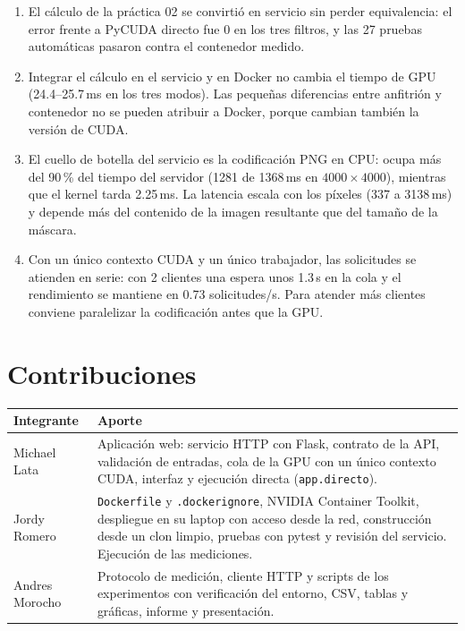 \documentclass[12pt]{article}
\begin{document}
\begin{enumerate}
\item El cálculo de la práctica 02 se convirtió en servicio sin perder equivalencia: el error frente a
      PyCUDA directo fue 0 en los tres filtros, y las 27 pruebas automáticas pasaron contra el
      contenedor medido.
\item Integrar el cálculo en el servicio y en Docker no cambia el tiempo de GPU (24.4--25.7\,ms en los
      tres modos). Las pequeñas diferencias entre anfitrión y contenedor no se pueden atribuir a
      Docker, porque cambian también la versión de CUDA.
\item El cuello de botella del servicio es la codificación PNG en CPU: ocupa más del 90\,\% del tiempo
      del servidor (1281 de 1368\,ms en $4000\times4000$), mientras que el kernel tarda 2.25\,ms. La
      latencia escala con los píxeles (337 a 3138\,ms) y depende más del contenido de la imagen
      resultante que del tamaño de la máscara.
\item Con un único contexto CUDA y un único trabajador, las solicitudes se atienden en serie: con 2
      clientes una espera unos 1.3\,s en la cola y el rendimiento se mantiene en 0.73 solicitudes/s.
      Para atender más clientes conviene paralelizar la codificación antes que la GPU.
\end{enumerate}

\section{Contribuciones}

\begin{table}[H]
\centering
\small
\begin{tabular}{p{3cm}p{11.2cm}}
\toprule
Integrante & Aporte \\
\midrule
Michael Lata & Aplicación web: servicio HTTP con Flask, contrato de la API, validación de entradas,
cola de la GPU con un único contexto CUDA, interfaz y ejecución directa (\texttt{app.directo}). \\
Jordy Romero & \texttt{Dockerfile} y \texttt{.dockerignore}, NVIDIA Container Toolkit, despliegue en su
laptop con acceso desde la red, construcción desde un clon limpio, pruebas con pytest y revisión del
servicio. Ejecución de las mediciones. \\
Andres Morocho & Protocolo de medición, cliente HTTP y scripts de los experimentos con verificación
del entorno, CSV, tablas y gráficas, informe y presentación. \\
\bottomrule
\end{tabular}
\end{table}
\end{document}
